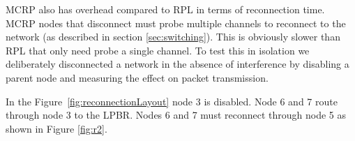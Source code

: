 

MCRP also has overhead compared to RPL in terms of reconnection time.  MCRP nodes that disconnect must probe multiple channels to reconnect to the network (as described in section \ref{sec:switching}).  This is obviously slower than RPL that only need probe a single channel.  To test this in isolation we deliberately disconnected a network in the absence of interference by disabling a parent node and measuring the effect on packet transmission.

In the Figure~\ref{fig:reconnectionLayout} node 3 is disabled.
Node 6 and 7 route through node 3 to the LPBR. Nodes 6 and 7 must reconnect through node 5 as shown in Figure \ref{fig:r2}. 

